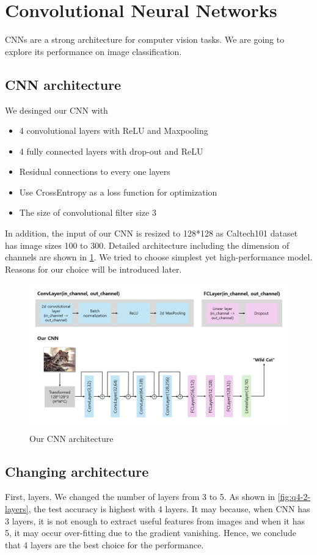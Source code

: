 \section{Convolutional Neural Networks}
\label{sec:intro}

CNNs are a strong architecture for computer vision tasks. We are going to explore its performance on image classification.

\subsection{CNN architecture}
We desinged our CNN with
\begin{itemize}
	\item 4 convolutional layers with ReLU and Maxpooling
	\item 4 fully connected layers with drop-out and ReLU
	\item Residual connections to every one layers
	\item Use CrossEntropy as a loss function for optimization
	\item The size of convolutional filter size 3
\end{itemize}
In addition, the input of our CNN is resized to 128*128 as Caltech101 dataset has image sizes 100 to 300. Detailed architecture including the dimension of channels are shown in \cref{fig:cnn_arch}. We tried to choose simplest yet high-performance model. Reasons for our choice will be introduced later.
\begin{figure}[htbp]
	\centering
	\includegraphics[width=0.7\linewidth]{image/q4-1-arch.png}
	\caption{Our CNN architecture}
	\label{fig:cnn_arch}
\end{figure}

\subsection{Changing architecture}
First, layers. We changed the number of layers from 3 to 5. As shown in \cref{fig:q4-2-layers}, the test accuracy is highest with 4 layers. It may because, when CNN has 3 layers, it is not enough to extract useful features from images and when it has 5, it may occur over-fitting due to the gradient vanishing. Hence, we conclude that 4 layers are the best choice for the performance.

